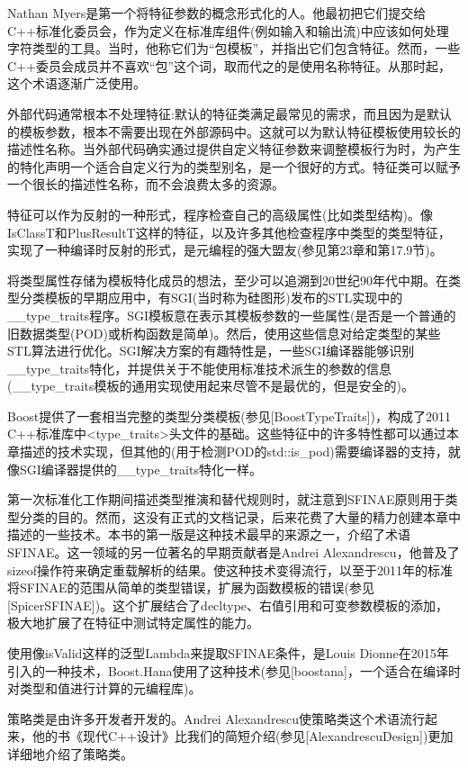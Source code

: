 Nathan Myers是第一个将特征参数的概念形式化的人。他最初把它们提交给C++标准化委员会，作为定义在标准库组件(例如输入和输出流)中应该如何处理字符类型的工具。当时，他称它们为“包模板”，并指出它们包含特征。然而，一些C++委员会成员并不喜欢“包”这个词，取而代之的是使用名称特征。从那时起，这个术语逐渐广泛使用。

外部代码通常根本不处理特征:默认的特征类满足最常见的需求，而且因为是默认的模板参数，根本不需要出现在外部源码中。这就可以为默认特征模板使用较长的描述性名称。当外部代码确实通过提供自定义特征参数来调整模板行为时，为产生的特化声明一个适合自定义行为的类型别名，是一个很好的方式。特征类可以赋予一个很长的描述性名称，而不会浪费太多的资源。

特征可以作为反射的一种形式，程序检查自己的高级属性(比如类型结构)。像IsClassT和PlusResultT这样的特征，以及许多其他检查程序中类型的类型特征，实现了一种编译时反射的形式，是元编程的强大盟友(参见第23章和第17.9节)。

将类型属性存储为模板特化成员的想法，至少可以追溯到20世纪90年代中期。在类型分类模板的早期应用中，有SGI(当时称为硅图形)发布的STL实现中的\_\_type\_traits程序。SGI模板意在表示其模板参数的一些属性(是否是一个普通的旧数据类型(POD)或析构函数是简单)。然后，使用这些信息对给定类型的某些STL算法进行优化。SGI解决方案的有趣特性是，一些SGI编译器能够识别\_\_type\_traits特化，并提供关于不能使用标准技术派生的参数的信息(\_\_type\_traits模板的通用实现使用起来尽管不是最优的，但是安全的)。

Boost提供了一套相当完整的类型分类模板(参见[BoostTypeTraits])，构成了2011 C++标准库中<type\_traits>头文件的基础。这些特征中的许多特性都可以通过本章描述的技术实现，但其他的(用于检测POD的std::is\_pod)需要编译器的支持，就像SGI编译器提供的\_\_type\_traits特化一样。

第一次标准化工作期间描述类型推演和替代规则时，就注意到SFINAE原则用于类型分类的目的。然而，这没有正式的文档记录，后来花费了大量的精力创建本章中描述的一些技术。本书的第一版是这种技术最早的来源之一，介绍了术语SFINAE。这一领域的另一位著名的早期贡献者是Andrei Alexandrescu，他普及了sizeof操作符来确定重载解析的结果。使这种技术变得流行，以至于2011年的标准将SFINAE的范围从简单的类型错误，扩展为函数模板的错误(参见[SpicerSFINAE])。这个扩展结合了decltype、右值引用和可变参数模板的添加，极大地扩展了在特征中测试特定属性的能力。

使用像isValid这样的泛型Lambda来提取SFINAE条件，是Louis Dionne在2015年引入的一种技术，Boost.Hana使用了这种技术(参见[boostana]，一个适合在编译时对类型和值进行计算的元编程库)。

策略类是由许多开发者开发的。Andrei Alexandrescu使策略类这个术语流行起来，他的书《现代C++设计》比我们的简短介绍(参见[AlexandrescuDesign])更加详细地介绍了策略类。